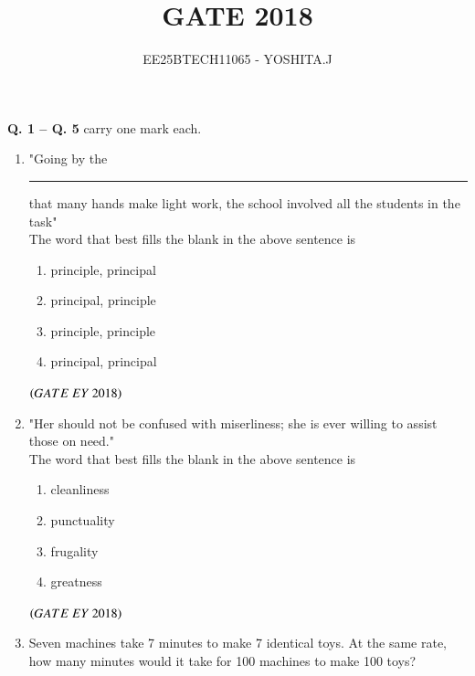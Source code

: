 \documentclass[journal]{IEEEtran}
\numberwithin{equation}{enumi}
\numberwithin{figure}{enumi}
\begin{document}

\vspace{3cm}

\title{GATE 2018}
\author{EE25BTECH11065 - YOSHITA.J}
\maketitle

\noindent \textbf{Q. 1 -- Q. \textbf{5}} carry one mark each.

\begin{enumerate}
    \item "Going by the\rule{3cm}{0.15mm} that many hands make light work, the school\underline{\hspace{3cm}} involved all the students in the task"\\The word that best fills the blank in the above sentence is
    \begin{multicols}{2}
    \begin{enumerate}
        \item  principle, principal
        \item  principal, principle\\
        \item  principle, principle
        \item  principal, principal
    \end{enumerate}
    \end{multicols}
    \hfill{$\brak{ GATE\ EY\ 2018}$}
    \bigskip
    \item "Her\underline{\hspace{3cm}} should not be confused with miserliness; she is ever willing to assist those on need."\\The word that best fills the blank in the above sentence is
\begin{multicols}{4}
\begin{enumerate}
    \item cleanliness
    \item punctuality
    \item frugality
    \item greatness
\end{enumerate}
\end{multicols}
\hfill{$\brak{ GATE\ EY\ 2018}$}
\bigskip
\item Seven machines take 7 minutes to make 7 identical toys. At the same rate, how many minutes would it take for 100 machines to make 100 toys?
\begin{multicols}{4}

\end{multicols}
\end{enumerate}
\end{document}
